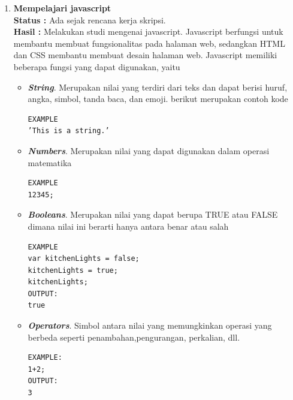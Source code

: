 \documentclass[a4paper,twoside]{article}
\begin{document}
\begin{enumerate}
		\item \textbf{Mempelajari javascript}\\
		{\bf Status :} Ada sejak rencana kerja skripsi.\\
		{\bf Hasil :} Melakukan studi mengenai javascript. Javascript berfungsi untuk membantu membuat fungsionalitas pada halaman web, sedangkan HTML dan CSS membantu membuat desain halaman web. Javascript memiliki beberapa fungsi yang dapat digunakan, yaitu
		\begin{itemize}
		    \item \textbf{\textit{String}}. Merupakan nilai yang terdiri dari teks dan dapat berisi huruf, angka, simbol, tanda baca, dan emoji. berikut merupakan contoh kode	
		    \begin{verbatim}
EXAMPLE		  
’This is a string.’
		    \end{verbatim}
		    \vspace{-5mm}
		    \item \textbf{\textit{Numbers}}. Merupakan nilai yang dapat digunakan dalam operasi matematika
		    \begin{verbatim}
EXAMPLE		    
12345;
		    \end{verbatim}
		    \vspace{-5mm}
		    \item \textbf{\textit{Booleans}}. Merupakan nilai yang dapat berupa TRUE atau FALSE dimana nilai ini berarti hanya antara benar atau salah
		    \begin{verbatim}
EXAMPLE
var kitchenLights = false;
kitchenLights = true;
kitchenLights;
OUTPUT:
true
		    \end{verbatim}
		    \vspace{-5mm}
		    \item \textbf{\textit{Operators}}. Simbol antara nilai yang memungkinkan operasi yang berbeda seperti penambahan,pengurangan, perkalian, dll.
		    \begin{verbatim}
EXAMPLE:
1+2;
OUTPUT:
3
		    \end{verbatim}
		    \vspace{-5mm}


\end{itemize}
\end{enumerate}
\end{document}
